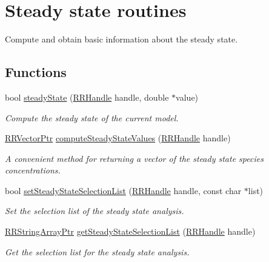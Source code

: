 \hypertarget{group__steadystate}{\section{Steady state routines}
\label{group__steadystate}
}


Compute and obtain basic information about the steady state.  


\subsection*{Functions}
\begin{DoxyCompactItemize}
\item 
bool \hyperlink{group__steadystate_ga6585d37a9c56840e1acbb38e9df07262}{steady\+State} (\hyperlink{rrc__types_8h_a1d68f0592372208fa5a5f2799ea4b3ae}{R\+R\+Handle} handle, double $\ast$value)
\begin{DoxyCompactList}\small\item\em Compute the steady state of the current model. \end{DoxyCompactList}\item 
\hyperlink{rrc__types_8h_a3be72d6006034fd349f753d2bf441bf7}{R\+R\+Vector\+Ptr} \hyperlink{group__steadystate_gac30f43194bb3045396e40cc6c0ffa24d}{compute\+Steady\+State\+Values} (\hyperlink{rrc__types_8h_a1d68f0592372208fa5a5f2799ea4b3ae}{R\+R\+Handle} handle)
\begin{DoxyCompactList}\small\item\em A convenient method for returning a vector of the steady state species concentrations. \end{DoxyCompactList}\item 
bool \hyperlink{group__steadystate_ga9b9f94c413981a2e1e9df3c6ea43ce4a}{set\+Steady\+State\+Selection\+List} (\hyperlink{rrc__types_8h_a1d68f0592372208fa5a5f2799ea4b3ae}{R\+R\+Handle} handle, const char $\ast$list)
\begin{DoxyCompactList}\small\item\em Set the selection list of the steady state analysis. \end{DoxyCompactList}\item 
\hyperlink{rrc__types_8h_a7c9475df6c7337d99482b13a365e7596}{R\+R\+String\+Array\+Ptr} \hyperlink{group__steadystate_gac90278de49539b861fdde7d7d0a51918}{get\+Steady\+State\+Selection\+List} (\hyperlink{rrc__types_8h_a1d68f0592372208fa5a5f2799ea4b3ae}{R\+R\+Handle} handle)
\begin{DoxyCompactList}\small\item\em Get the selection list for the steady state analysis. \end{DoxyCompactList}\end{DoxyCompactItemize}


